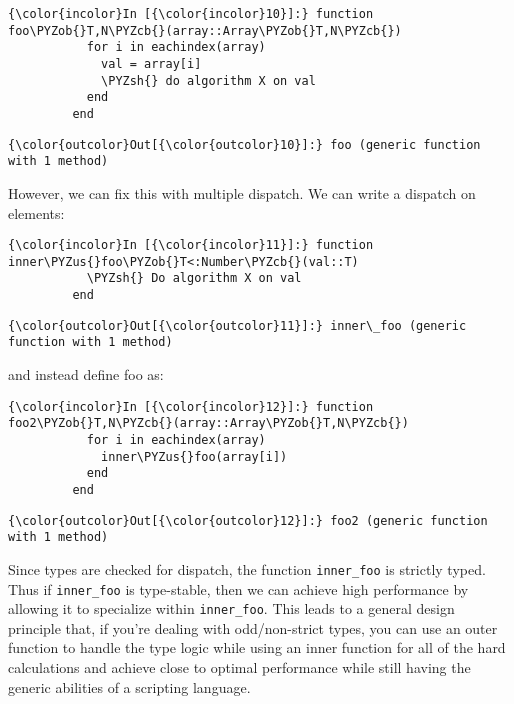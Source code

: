 \documentclass[11pt]{article}
\def\PYZus{\char`\_}
\def\PYZob{\char`\{}
\def\PYZcb{\char`\}}
\def\PYZsh{\char`\#}
\begin{document}
    \begin{Verbatim}[commandchars=\\\{\}]
{\color{incolor}In [{\color{incolor}10}]:} function foo\PYZob{}T,N\PYZcb{}(array::Array\PYZob{}T,N\PYZcb{})
           for i in eachindex(array)
             val = array[i]
             \PYZsh{} do algorithm X on val
           end
         end
\end{Verbatim}

            \begin{Verbatim}[commandchars=\\\{\}]
{\color{outcolor}Out[{\color{outcolor}10}]:} foo (generic function with 1 method)
\end{Verbatim}
        
    However, we can fix this with multiple dispatch. We can write a dispatch
on elements:

    \begin{Verbatim}[commandchars=\\\{\}]
{\color{incolor}In [{\color{incolor}11}]:} function inner\PYZus{}foo\PYZob{}T<:Number\PYZcb{}(val::T)
           \PYZsh{} Do algorithm X on val
         end
\end{Verbatim}

            \begin{Verbatim}[commandchars=\\\{\}]
{\color{outcolor}Out[{\color{outcolor}11}]:} inner\_foo (generic function with 1 method)
\end{Verbatim}
        
    and instead define foo as:

    \begin{Verbatim}[commandchars=\\\{\}]
{\color{incolor}In [{\color{incolor}12}]:} function foo2\PYZob{}T,N\PYZcb{}(array::Array\PYZob{}T,N\PYZcb{})
           for i in eachindex(array)
             inner\PYZus{}foo(array[i])
           end
         end
\end{Verbatim}

            \begin{Verbatim}[commandchars=\\\{\}]
{\color{outcolor}Out[{\color{outcolor}12}]:} foo2 (generic function with 1 method)
\end{Verbatim}
        
    Since types are checked for dispatch, the function \texttt{inner\_foo}
is strictly typed. Thus if \texttt{inner\_foo} is type-stable, then we
can achieve high performance by allowing it to specialize within
\texttt{inner\_foo}. This leads to a general design principle that, if
you're dealing with odd/non-strict types, you can use an outer function
to handle the type logic while using an inner function for all of the
hard calculations and achieve close to optimal performance while still
having the generic abilities of a scripting language.
\end{document}
